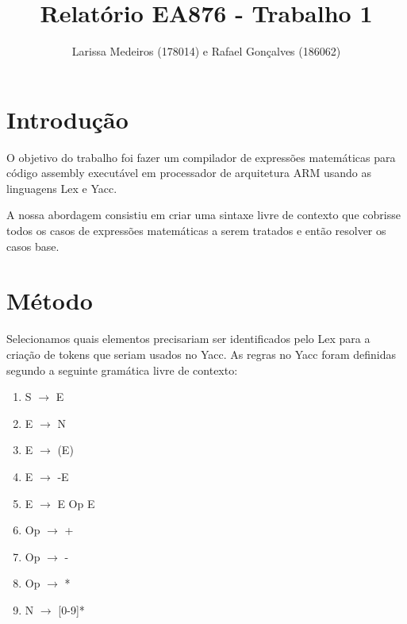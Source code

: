 \documentclass[a4paper, 11pt]{article}
\title{Relatório EA876 - Trabalho 1}
\author{Larissa Medeiros (178014) e Rafael Gonçalves (186062)}
\date{}
\begin{document}
\maketitle
\begin{multicols*}{2}

\section*{Introdução}

    O objetivo do trabalho foi fazer um compilador de expressões matemáticas para código assembly executável em processador de arquitetura ARM usando as linguagens Lex e Yacc.

A nossa abordagem consistiu em criar uma sintaxe livre de contexto que cobrisse todos os casos de expressões matemáticas a serem tratados e então resolver os casos base.

\section*{Método}

Selecionamos quais elementos precisariam ser identificados pelo Lex para a criação de tokens que seriam usados no Yacc. As regras no Yacc foram definidas segundo a seguinte gramática livre de contexto:

\begin{multicols*}{2}
\setlength{\columnsep}{0em}
\begin{enumerate}
\item
S $\rightarrow$ E

\item
E $\rightarrow$ N

\item
E $\rightarrow$ (E)

\item
E $\rightarrow$ -E

\item
E $\rightarrow$ E Op E

\item
Op $\rightarrow$ +

\item
Op $\rightarrow$ -

\item
Op $\rightarrow$ *

\item
N $\rightarrow$ [0-9]*

\end{enumerate}

\end{multicols*}


\end{multicols*}
\end{document}
